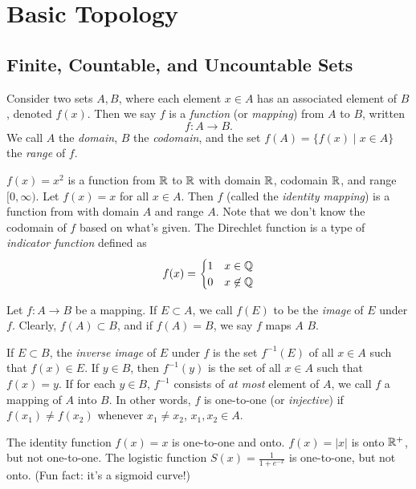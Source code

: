 \documentclass{article}
\begin{document}
\section{Basic Topology}
\subsection{Finite, Countable, and Uncountable Sets}
\begin{definition}
    Consider two sets $A,B$, where each element $x\in A$ has an associated element of $B$, denoted $f(x)$. Then we say $f$ is a \emph{function} (or \textit{mapping}) from $A$ to $B$, written \[f:A\rightarrow B.\]We call $A$ the \textit{domain}, $B$ the \textit{codomain}, and the set $f(A)=\{f(x)\mid x\in A\}$ the \textit{range} of $f$.
\end{definition}
\begin{example}
    \listhack 
    \begin{enumerate}
        \ii $f(x)=x^{2}$ is a function from $\mathbb R$ to $\mathbb R$ with domain $\mathbb R$, codomain $\mathbb R$, and range $[0,\infty)$.
        \ii Let $f(x)=x$ for all $x\in A$. Then $f$ (called the \textit{identity mapping}) is a function from with domain $A$ and range $A$. Note that we don't know the codomain of $f$ based on what's given.
        \ii The Direchlet function is a type of \textit{indicator function} defined as \[f(x)=\begin{cases}
            1 & x\in\mathbb Q \\
            0 & x\not\in\mathbb Q 
        \end{cases}\]
    \end{enumerate}
\end{example}
\begin{definition}
    Let $f:A\rightarrow B$ be a mapping. If $E\subset A$, we call $f(E)$ to be the \textit{image} of $E$ under $f$. Clearly, $f(A)\subset B$, and if $f(A)=B$, we say $f$ maps $A$  $B$. 

    If $E\subset B$, the \textit{inverse image} of $E$ under $f$ is the set $f^{-1}(E)$ of all $x\in A$ such that $f(x)\in E$. If $y\in B$, then $f^{-1}(y)$ is the set of all $x\in A$ such that $f(x)=y$. If for each $y\in B$, $f^{-1}$ consists of \textit{at most} element of $A$, we call $f$ a  mapping of $A$ into $B$. In other words, $f$ is one-to-one (or \textit{injective}) if $f(x_{1})\neq f(x_{2})$ whenever $x_{1}\neq x_{2}$, $x_{1},x_{2}\in A$.
\end{definition}
\begin{example}
    \listhack 
    \begin{enumerate}
        \ii The identity function $f(x)=x$ is one-to-one and onto.
        \ii $f(x)=|x|$ is onto $\mathbb R^{+}$, but not one-to-one.
        \ii The logistic function $S(x)=\frac{1}{1+e^{-x}}$ is one-to-one, but not onto. (Fun fact: it's a sigmoid curve!)
    \end{enumerate}
\end{example}
\end{document}
